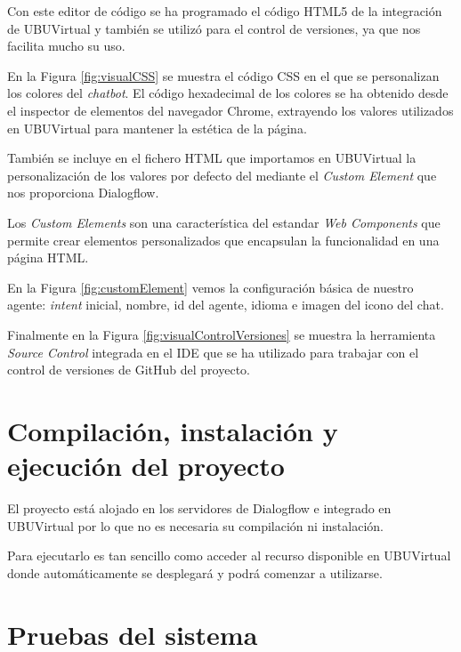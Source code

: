 Con este editor de código se ha programado el código HTML5 de la integración de UBUVirtual y también se utilizó para el control de versiones, ya que nos facilita mucho su uso.


En la Figura \ref{fig:visualCSS} se muestra el código CSS en el que se personalizan los colores del \textit{chatbot}. El código hexadecimal de los colores se ha obtenido desde el inspector de elementos del navegador Chrome, extrayendo los valores utilizados en UBUVirtual para mantener la estética de la página.

También se incluye en el fichero HTML que importamos en UBUVirtual la personalización de los valores por defecto del  mediante el \textit{Custom Element} que nos proporciona Dialogflow.

Los \textit{Custom Elements} son una característica del estandar \textit{Web Components} que permite crear elementos personalizados que encapsulan la funcionalidad en una página HTML. \cite{customElements}

En la Figura \ref{fig:customElement} vemos la configuración básica de nuestro agente: \textit{intent} inicial, nombre, id del agente, idioma e imagen del icono del chat.


Finalmente en la Figura \ref{fig:visualControlVersiones} se muestra la herramienta \textit{Source Control} integrada en el IDE que se ha utilizado para trabajar con el control de versiones de GitHub del proyecto. 





\section{Compilación, instalación y ejecución del proyecto}

El proyecto está alojado en los servidores de Dialogflow e integrado en UBUVirtual por lo que no es necesaria su compilación ni instalación.

Para ejecutarlo es tan sencillo como acceder al recurso disponible en UBUVirtual donde automáticamente se desplegará y podrá comenzar a utilizarse.


\section{Pruebas del sistema}

